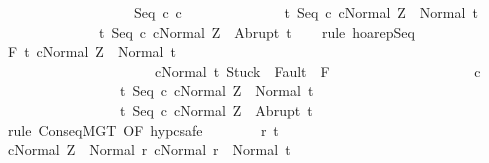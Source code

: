 \begin{isabellebody}
\ \ \ \ \ \ \ \ \ \ \ \ \ \ \ \ \ \ \ Seq\ c{}\ c{}\isanewline
\ \ \ \ \ \ \ \ \ \ \ \ \ \ {\isacharbraceleft}t{\isachardot}\ {\isasymGamma}{\isasymturnstile}{\isasymlangle}Seq\ c{}\ c{}{\isacharcomma}Normal\ Z{\isasymrangle}\ {\isasymRightarrow}\ Normal\ t{\isacharbraceright}{\isacharcomma}\isanewline
\ \ \ \ \ \ \ \ \ \ \ \ \ \ {\isacharbraceleft}t{\isachardot}\ {\isasymGamma}{\isasymturnstile}{\isasymlangle}Seq\ c{}\ c{}{\isacharcomma}Normal\ Z{\isasymrangle}\ {\isasymRightarrow}\ Abrupt\ t{\isacharbraceright}{\isachardoublequoteclose}\isanewline
\ \ \isamarkupfalse%
\ {\isacharparenleft}rule\ hoarep{\isachardot}Seq\ {\isacharparenright}\isanewline
\ \ \ \ \isamarkupfalse%
\ {\isachardoublequoteopen}{\isasymGamma}{\isacharcomma}{\isasymTheta}{\isasymturnstile}\isactrlbsub {\isacharslash}F\isactrlesub \ {\isacharbraceleft}t{\isachardot}\ {\isasymGamma}{\isasymturnstile}{\isasymlangle}c{}{\isacharcomma}Normal\ Z{\isasymrangle}\ {\isasymRightarrow}\ Normal\ t\ {\isasymand}\ \isanewline
\ \ \ \ \ \ \ \ \ \ \ \ \ \ \ \ \ \ \ \ \ \ {\isasymGamma}{\isasymturnstile}{\isasymlangle}c{}{\isacharcomma}Normal\ t{\isasymrangle}\ {\isasymRightarrow}{\isasymnotin}{\isacharparenleft}{\isacharbraceleft}Stuck{\isacharbraceright}\ {\isasymunion}\ Fault\ {\isacharbackquote}\ {\isacharparenleft}{\isacharminus}F{\isacharparenright}{\isacharparenright}{\isacharbraceright}\ \isanewline
\ \ \ \ \ \ \ \ \ \ \ \ \ \ \ \ \ \ \ c{}\isanewline
\ \ \ \ \ \ \ \ \ \ \ \ \ \ \ \ \ {\isacharbraceleft}t{\isachardot}\ {\isasymGamma}{\isasymturnstile}{\isasymlangle}Seq\ c{}\ c{}{\isacharcomma}Normal\ Z{\isasymrangle}\ {\isasymRightarrow}\ Normal\ t{\isacharbraceright}{\isacharcomma}\isanewline
\ \ \ \ \ \ \ \ \ \ \ \ \ \ \ \ \ {\isacharbraceleft}t{\isachardot}\ {\isasymGamma}{\isasymturnstile}{\isasymlangle}Seq\ c{}\ c{}{\isacharcomma}Normal\ Z{\isasymrangle}\ {\isasymRightarrow}\ Abrupt\ t{\isacharbraceright}{\isachardoublequoteclose}\isanewline
\ \ \ \ \isamarkupfalse%
\ {\isacharparenleft}rule\ ConseqMGT\ {\isacharbrackleft}OF\ hyp{\isacharunderscore}c{}{\isacharbrackright}{\isacharcomma}safe{\isacharparenright}\isanewline
\ \ \ \ \ \ \isamarkupfalse%
\ r\ t\isanewline
\ \ \ \ \ \ \isamarkupfalse%
\ {\isachardoublequoteopen}{\isasymGamma}{\isasymturnstile}{\isasymlangle}c{}{\isacharcomma}Normal\ Z{\isasymrangle}\ {\isasymRightarrow}\ Normal\ r{\isachardoublequoteclose}\ {\isachardoublequoteopen}{\isasymGamma}{\isasymturnstile}{\isasymlangle}c{}{\isacharcomma}Normal\ r{\isasymrangle}\ {\isasymRightarrow}\ Normal\ t{\isachardoublequoteclose}\isanewline

\end{isabellebody}
